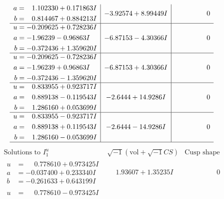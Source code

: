 \documentclass[1p]{elsarticle_modified}
\theoremstyle{definition}
\newcommand{\I}{\sqrt{-1}}
\begin{document}
$$\begin{array}{c|c|c}
\begin{aligned}
a &= \phantom{-}1.102330 + 0.171863 I \\
b &= \phantom{-}0.814467 + 0.884213 I\end{aligned}
 & -3.92574 + 8.99449 I & \phantom{-0.000000 } 0 \\ \hline\begin{aligned}
u &= -0.209625 + 0.728236 I \\
a &= -1.96239 - 0.96863 I \\
b &= -0.372436 + 1.359620 I\end{aligned}
 & -6.87153 - 4.30366 I & \phantom{-0.000000 } 0 \\ \hline\begin{aligned}
u &= -0.209625 - 0.728236 I \\
a &= -1.96239 + 0.96863 I \\
b &= -0.372436 - 1.359620 I\end{aligned}
 & -6.87153 + 4.30366 I & \phantom{-0.000000 } 0 \\ \hline\begin{aligned}
u &= \phantom{-}0.833955 + 0.923717 I \\
a &= \phantom{-}0.889138 - 0.119543 I \\
b &= \phantom{-}1.286160 + 0.053699 I\end{aligned}
 & -2.6444 + 14.9286 I & \phantom{-0.000000 } 0 \\ \hline\begin{aligned}
u &= \phantom{-}0.833955 - 0.923717 I \\
a &= \phantom{-}0.889138 + 0.119543 I \\
b &= \phantom{-}1.286160 - 0.053699 I\end{aligned}
 & -2.6444 - 14.9286 I & \phantom{-0.000000 } 0\\
 \hline 
 \end{array}$$\newpage$$\begin{array}{c|c|c}  
\text{Solutions to }I^u_{1}& \I (\text{vol} + \sqrt{-1}CS) & \text{Cusp shape}\\
 \hline 
\begin{aligned}
u &= \phantom{-}0.778610 + 0.973425 I \\
a &= -0.037400 + 0.233340 I \\
b &= -0.261633 + 0.643199 I\end{aligned}
 & \phantom{-}1.93607 + 1.35235 I & \phantom{-0.000000 } 0 \\ \hline\begin{aligned}
u &= \phantom{-}0.778610 - 0.973425 I \\

\end{aligned}
\end{array}$$
\end{document}
